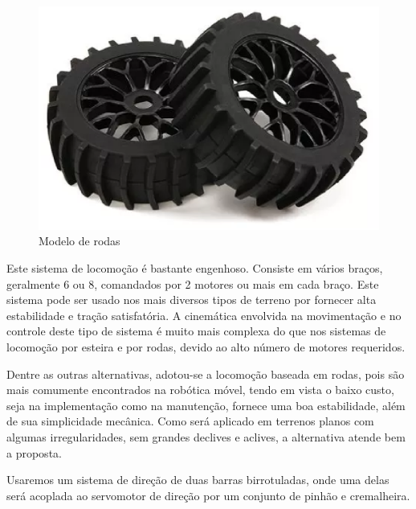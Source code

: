       
    \begin{figure}[!htbp]
    \begin{center}
	  \includegraphics[keepaspectratio=true,scale=0.3]{figuras/wheels.eps}
    \caption{\label{WHEELS}Modelo de rodas}
    \end{center}
    \end{figure}

    \newpage

      
      Este sistema de locomoção é bastante engenhoso. Consiste em vários braços, geralmente 6 ou 8, comandados por 2 motores ou 
      mais em cada braço. Este sistema pode ser usado nos mais diversos tipos de terreno por fornecer alta estabilidade e tração 
      satisfatória. A cinemática envolvida na movimentação e no controle deste tipo de sistema é muito mais complexa do que nos 
      sistemas de locomoção por esteira e por rodas, devido ao alto número de motores requeridos.
      
      
      
      Dentre as outras alternativas, adotou-se a locomoção baseada em rodas, pois são mais comumente encontrados na robótica móvel, 
      tendo em vista o baixo custo, seja na implementação como na manutenção, fornece uma boa estabilidade, além de sua simplicidade
      mecânica. Como será aplicado em terrenos planos com algumas irregularidades, sem grandes declives e aclives, a alternativa 
      atende bem a proposta. \cite{matsumura2014desenvolvimento}
      
      Usaremos um sistema de direção de duas barras birrotuladas, onde uma delas será acoplada ao servomotor de direção por um 
      conjunto de pinhão e cremalheira.
      
